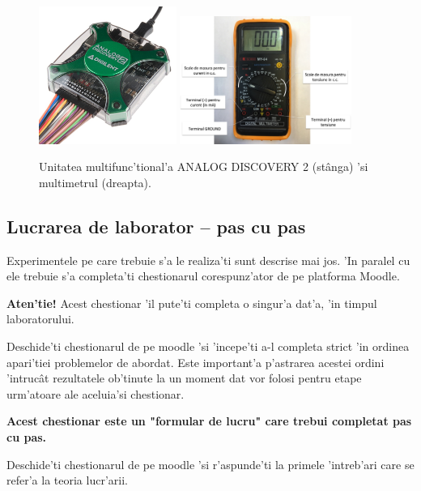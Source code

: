 \begin{figure}
	\centering
		\includegraphics[width=0.4\textwidth]{laborator_01/figuri/4_AD2.jpg}
		\includegraphics[width=0.5\textwidth]{laborator_01/figuri/4_multimetru_prel}
	\caption{Unitatea multifunc'tional'a ANALOG DISCOVERY 2 (st\^anga) 'si multimetrul (dreapta).}
	\label{fig:4_AD2_multi}
\end{figure}
%
%
\subsection*{Lucrarea de laborator -- pas cu pas}

Experimentele pe care trebuie s'a le realiza'ti sunt descrise mai jos. 'In paralel cu ele trebuie s'a completa'ti chestionarul corespunz'ator de pe platforma Moodle.

 \textbf{\color{red} Aten'tie!} Acest chestionar 'il pute'ti completa o singur'a dat'a, 'in timpul laboratorului. 

Deschide'ti chestionarul de pe moodle 'si 'incepe'ti a-l completa strict 'in ordinea apari'tiei problemelor de abordat. Este important'a p'astrarea acestei ordini 'intruc\^at rezultatele ob'tinute la un moment dat vor folosi pentru etape urm'atoare ale aceluia'si chestionar. 

\textbf{\color{red} Acest chestionar este un "formular de lucru" care trebui  completat pas cu pas.}

\begin{exercise}
	Deschide'ti chestionarul de pe moodle 'si  r'aspunde'ti la primele 'intreb'ari care se refer'a la teoria lucr'arii.
\end{exercise}


